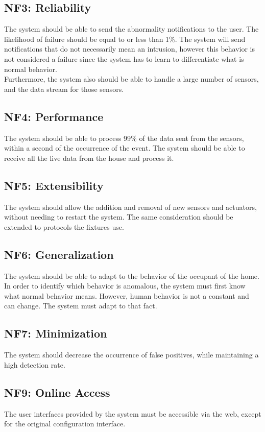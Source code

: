 \subsection{NF3: Reliability}
The system should be able to send the abnormality notifications to the user. The likelihood of failure should be equal to or less than 1\%. The system will send notifications that do not necessarily mean an intrusion, however this behavior is not considered a failure since the system has to learn to differentiate what is normal behavior.  \\
Furthermore, the system also should be able to handle a large number of sensors, and the data stream for those sensors.

\subsection{NF4: Performance}
The system should be able to process 99\% of the data sent from the sensors, within a second of the occurrence of the event. The system should be able to receive all the live data from the house and process it.

\subsection{NF5: Extensibility}
The system should allow the addition and removal of new sensors and actuators, without needing to restart the system.
The same consideration should be extended to protocols the fixtures use.

\subsection{NF6: Generalization}
The system should be able to adapt to the behavior of the occupant of the home. In order to identify which behavior is anomalous, the system must first know what normal behavior means. However, human behavior is not a constant and can change. The system must adapt to that fact.

\subsection{NF7: Minimization}
The system should decrease the occurrence of false positives, while maintaining a high detection rate.

\subsection{NF9: Online Access}
The user interfaces provided by the system must be accessible via the web, except for the original configuration interface.



